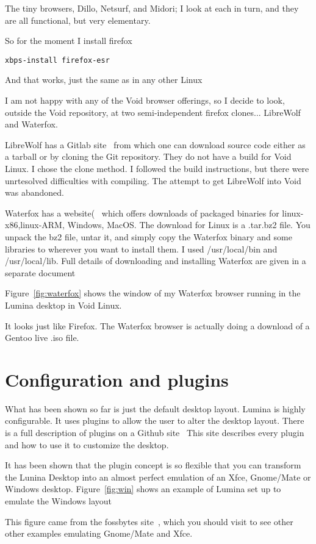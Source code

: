 \documentclass{article}  %
\begin{document}
{The tiny browsers, Dillo, Netsurf, and Midori; I look at each in turn, and they are all functional, but very elementary. 

So for the moment I install firefox
\begin{verbatim}
xbps-install firefox-esr
\end{verbatim}
And that works, just the same as in any other Linux

I am not happy with any of the Void browser offerings, so I decide to look, outside the Void repository, at two semi-independent firefox clones... LibreWolf and Waterfox.

LibreWolf has a Gitlab site~\cite{libr:22} from which one can download source code either as a tarball or by  cloning the Git repository.  They do not have a build for Void Linux.  I chose the clone method. I followed the build instructions, but there were unrtesolved difficulties with compiling. The attempt to get LibreWolf  into Void was abandoned.

Waterfox has a website(~\cite{wate:22} which offers downloads of packaged binaries for linux-x86,linux-ARM, Windows, MacOS. The download for Linux is a .tar.bz2 file. You unpack the bz2 file, untar it, and simply copy the Waterfox binary and some libraries to wherever you want to install them. I used /usr/local/bin and /usr/local/lib. Full details of downloading and installing Waterfox are given in a separate document~\cite{waterfox:22}

Figure~\ref{fig:waterfox}  shows the window of my Waterfox browser running in the Lumina desktop in Void Linux. 

It looks just like Firefox. The Waterfox browser is actually doing a download of a Gentoo live .iso file. 

\section{Configuration and plugins}
What has been  shown so far is just the default desktop layout.
Lumina is highly configurable. It uses plugins to allow the user to alter the desktop layout. There is a full description of plugins on a Github site~\cite{plug:22} This site describes every plugin and how to use it to customize the desktop.

It has been shown that the plugin concept is so flexible that you can transform the Lunina Desktop into an almost perfect emulation of an Xfce, Gnome/Mate or Windows desktop. Figure~\ref{fig:win} shows an example of Lumina set up to emulate the Windows layout

This figure came from the fossbytes site~\cite{tran:22}, which you should visit to see other other examples emulating Gnome/Mate and Xfce.

}
\end{document}
